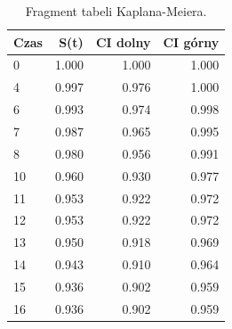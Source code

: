 \begin{table}[htbp]
\centering
\caption{Fragment tabeli Kaplana-Meiera.}
\label{tab:km}
\small
\setlength{\tabcolsep}{2.4pt}
\begin{tabular*}{.98\linewidth}{@{\extracolsep{\fill}}lrrr}
\toprule
Czas & S(t) & CI dolny & CI górny \\
\midrule
0 & 1.000 & 1.000 & 1.000 \\
4 & 0.997 & 0.976 & 1.000 \\
6 & 0.993 & 0.974 & 0.998 \\
7 & 0.987 & 0.965 & 0.995 \\
8 & 0.980 & 0.956 & 0.991 \\
10 & 0.960 & 0.930 & 0.977 \\
11 & 0.953 & 0.922 & 0.972 \\
12 & 0.953 & 0.922 & 0.972 \\
13 & 0.950 & 0.918 & 0.969 \\
14 & 0.943 & 0.910 & 0.964 \\
15 & 0.936 & 0.902 & 0.959 \\
16 & 0.936 & 0.902 & 0.959 \\
\bottomrule
\end{tabular*}
\end{table}
